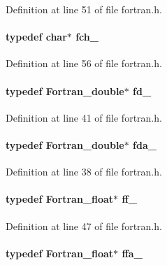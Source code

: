 Definition at line 51 of file fortran.h.

\paragraph[{fch\_\-}]{\setlength{\rightskip}{0pt plus 5cm}typedef char$\ast$ {\bf fch\_\-}}\hfill\label{fortran_8h_a81273aba430787283a433b39887fc80b}


Definition at line 56 of file fortran.h.

\paragraph[{fd\_\-}]{\setlength{\rightskip}{0pt plus 5cm}typedef {\bf Fortran\_\-double}$\ast$ {\bf fd\_\-}}\hfill\label{fortran_8h_ad74d85d4b442b08e79d12d1eb0157872}


Definition at line 41 of file fortran.h.

\paragraph[{fda\_\-}]{\setlength{\rightskip}{0pt plus 5cm}typedef {\bf Fortran\_\-double}$\ast$ {\bf fda\_\-}}\hfill\label{fortran_8h_a4a18500881ce6d14fcd7eb76b43d6d93}


Definition at line 38 of file fortran.h.

\paragraph[{ff\_\-}]{\setlength{\rightskip}{0pt plus 5cm}typedef {\bf Fortran\_\-float}$\ast$ {\bf ff\_\-}}\hfill\label{fortran_8h_a2cd3f526ba081495fe1fc71fcc154b75}


Definition at line 47 of file fortran.h.

\paragraph[{ffa\_\-}]{\setlength{\rightskip}{0pt plus 5cm}typedef {\bf Fortran\_\-float}$\ast$ {\bf ffa\_\-}}\hfill\label{fortran_8h_a388a9ee192080261f9fb708605a020a2}



